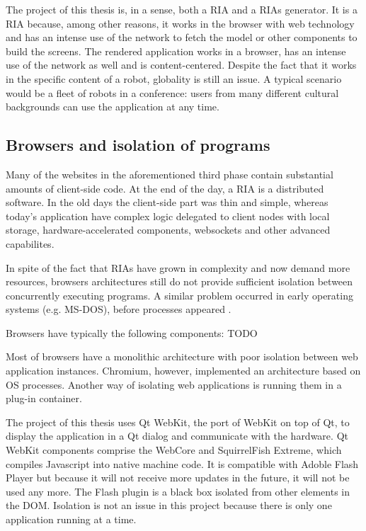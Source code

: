 The project of this thesis is, in a sense, both a \ac{RIA} and a \acp{RIA} generator. 
It is a \ac{RIA} because, among other reasons, it works in the browser with web technology and has an intense use of the network to fetch the model or other components to build the screens.
The rendered application works in a browser, has an intense use of the network as well and is content-centered.
Despite the fact that it works in the specific content of a robot, globality is still an issue. A typical scenario would be a fleet of robots in a conference: users from many different cultural backgrounds can use the application at any time.




\subsection{Browsers and isolation of programs}    
Many of the websites in the aforementioned third phase contain substantial amounts of client-side code. At the end of the day, a \ac{RIA} is a distributed software. 
In the old days the client-side part was thin and simple, whereas today's application have complex logic delegated to client nodes with local storage, hardware-accelerated components, websockets and other advanced capabilites.

In spite of the fact that \acp{RIA} have grown in complexity and now demand more resources, browsers architectures still do not provide sufficient isolation between concurrently executing programs.
A similar problem occurred in early operating systems (e.g. MS-DOS), before processes appeared \cite{Reis:2009}. 

Browsers have typically the following components: TODO

Most of browsers have a monolithic architecture with poor isolation between web application instances. Chromium, however, implemented an architecture based on OS processes. Another way of isolating web applications is running them in a plug-in container. 

The project of this thesis uses Qt WebKit, the port of WebKit on top of Qt, to display the application in a Qt dialog and communicate with the hardware. Qt WebKit components comprise the WebCore and SquirrelFish Extreme, which compiles Javascript into native machine code. It is compatible with Adoble Flash Player but because it will not receive more updates in the future, it will not be used any more.
The Flash plugin is a black box isolated from other elements in the \ac{DOM}. Isolation is not an issue in this project because there is only one application running at a time.


